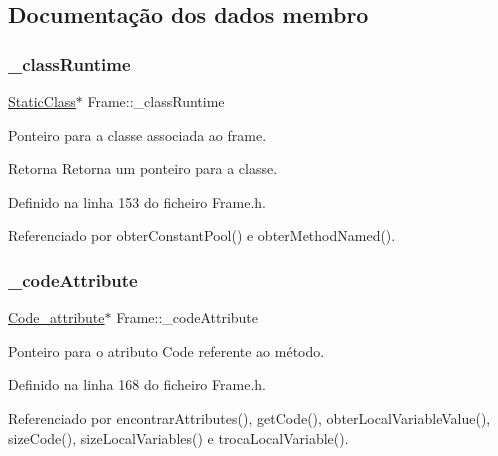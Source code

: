 \subsection{Documentação dos dados membro}
\mbox{\label{classFrame_aa6f380f48c5bac83780daed06dc04f9e}} 
\subsubsection{\texorpdfstring{\+\_\+class\+Runtime}{\_classRuntime}}
{\footnotesize\ttfamily \hyperlink{classStaticClass}{Static\+Class}$\ast$ Frame\+::\+\_\+class\+Runtime\hspace{0.3cm}{\ttfamily [private]}}



Ponteiro para a classe associada ao frame. 

\begin{DoxyReturn}{Retorna}
Retorna um ponteiro para a classe. 
\end{DoxyReturn}


Definido na linha 153 do ficheiro Frame.\+h.



Referenciado por obter\+Constant\+Pool() e obter\+Method\+Named().

\mbox{\label{classFrame_a0b7e80617513d7c1879e20510622103d}} 
\subsubsection{\texorpdfstring{\+\_\+code\+Attribute}{\_codeAttribute}}
{\footnotesize\ttfamily \hyperlink{structCode__attribute}{Code\+\_\+attribute}$\ast$ Frame\+::\+\_\+code\+Attribute\hspace{0.3cm}{\ttfamily [private]}}

Ponteiro para o atributo Code referente ao método. 

Definido na linha 168 do ficheiro Frame.\+h.



Referenciado por encontrar\+Attributes(), get\+Code(), obter\+Local\+Variable\+Value(), size\+Code(), size\+Local\+Variables() e troca\+Local\+Variable().

